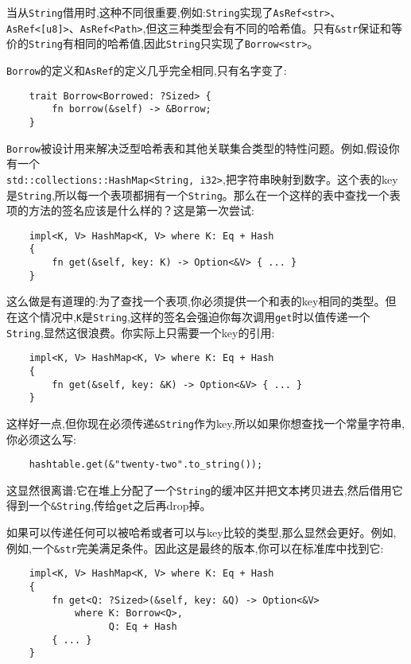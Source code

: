 当从\texttt{String}借用时,这种不同很重要,例如:\texttt{String}实现了\texttt{AsRef<str>}、\texttt{AsRef<[u8]>}、\texttt{AsRef<Path>},但这三种类型会有不同的哈希值。只有\texttt{\&str}保证和等价的\texttt{String}有相同的哈希值,因此\texttt{String}只实现了\texttt{Borrow<str>}。

\texttt{Borrow}的定义和\texttt{AsRef}的定义几乎完全相同,只有名字变了:
\begin{verbatim}
    trait Borrow<Borrowed: ?Sized> {
        fn borrow(&self) -> &Borrow;
    }
\end{verbatim}

\texttt{Borrow}被设计用来解决泛型哈希表和其他关联集合类型的特性问题。例如,假设你有一个\\
\texttt{std::collections::HashMap<String, i32>},把字符串映射到数字。这个表的key是\texttt{String},所以每一个表项都拥有一个\texttt{String}。那么在一个这样的表中查找一个表项的方法的签名应该是什么样的？这是第一次尝试:
\begin{verbatim}
    impl<K, V> HashMap<K, V> where K: Eq + Hash
    {
        fn get(&self, key: K) -> Option<&V> { ... }
    }
\end{verbatim}

这么做是有道理的:为了查找一个表项,你必须提供一个和表的key相同的类型。但在这个情况中,\texttt{K}是\texttt{String},这样的签名会强迫你每次调用\texttt{get}时以值传递一个\texttt{String},显然这很浪费。你实际上只需要一个key的引用:
\begin{verbatim}
    impl<K, V> HashMap<K, V> where K: Eq + Hash
    {
        fn get(&self, key: &K) -> Option<&V> { ... }
    }
\end{verbatim}

这样好一点,但你现在必须传递\texttt{\&String}作为key,所以如果你想查找一个常量字符串,你必须这么写:
\begin{verbatim}
    hashtable.get(&"twenty-two".to_string());
\end{verbatim}

这显然很离谱:它在堆上分配了一个\texttt{String}的缓冲区并把文本拷贝进去,然后借用它得到一个\texttt{\&String},传给\texttt{get}之后再drop掉。

如果可以传递任何可以被哈希或者可以与key比较的类型,那么显然会更好。例如,例如,一个\texttt{\&str}完美满足条件。因此这是最终的版本,你可以在标准库中找到它:
\begin{verbatim}
    impl<K, V> HashMap<K, V> where K: Eq + Hash
    {
        fn get<Q: ?Sized>(&self, key: &Q) -> Option<&V>
            where K: Borrow<Q>,
                  Q: Eq + Hash
        { ... }
    }
\end{verbatim}

